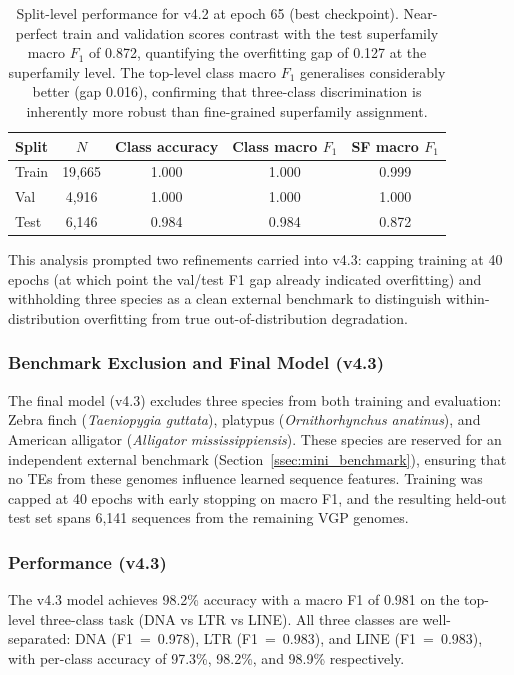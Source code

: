 \documentclass[12pt]{article}
\begin{document}
\begin{table}[h]
\centering
\begin{tabular}{lcccc}
\hline
Split & $N$ & Class accuracy & Class macro $F_1$ & SF macro $F_1$ \\
\hline
Train & 19{,}665 & 1.000 & 1.000 & 0.999 \\
Val   &  4{,}916 & 1.000 & 1.000 & 1.000 \\
Test  &  6{,}146 & 0.984 & 0.984 & 0.872 \\
\hline
\end{tabular}
\caption{Split-level performance for v4.2 at epoch 65 (best checkpoint). Near-perfect train and validation scores contrast with the test superfamily macro $F_1$ of 0.872, quantifying the overfitting gap of 0.127 at the superfamily level. The top-level class macro $F_1$ generalises considerably better (gap 0.016), confirming that three-class discrimination is inherently more robust than fine-grained superfamily assignment.}
\label{tab:v4_2_splits}
\end{table}

This analysis prompted two refinements carried into v4.3: capping training at 40 epochs (at which point the val/test F1 gap already indicated overfitting) and withholding three species as a clean external benchmark to distinguish within-distribution overfitting from true out-of-distribution degradation.


\subsubsection{Benchmark Exclusion and Final Model (v4.3)}

The final model (v4.3) excludes three species from both training and evaluation: Zebra finch (\textit{Taeniopygia guttata}), platypus (\textit{Ornithorhynchus anatinus}), and American alligator (\textit{Alligator mississippiensis}). These species are reserved for an independent external benchmark (Section~\ref{ssec:mini_benchmark}), ensuring that no TEs from these genomes influence learned sequence features. Training was capped at 40 epochs with early stopping on macro F1, and the resulting held-out test set spans 6,141 sequences from the remaining VGP genomes.

\subsubsection{Performance (v4.3)}

The v4.3 model achieves 98.2\% accuracy with a macro F1 of 0.981 on the top-level three-class task (DNA vs LTR vs LINE). All three classes are well-separated: DNA (F1~=~0.978), LTR (F1~=~0.983), and LINE (F1~=~0.983), with per-class accuracy of 97.3\%, 98.2\%, and 98.9\% respectively.
\end{document}
